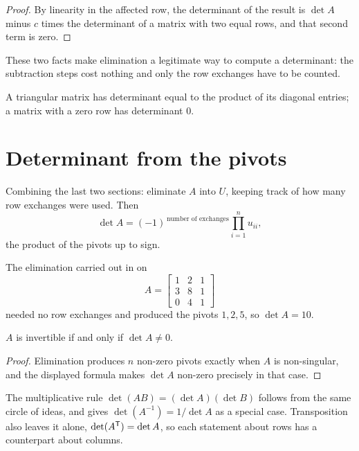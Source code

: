 \begin{proof}
By linearity in the affected row, the determinant of the result is
\(\det A\) minus \(c\) times the determinant of a matrix with two equal rows,
and that second term is zero.
\end{proof}

These two facts make elimination a legitimate way to compute a determinant: the
subtraction steps cost nothing and only the row exchanges have to be counted.

\begin{proposition}
A triangular matrix has determinant equal to the product of its diagonal
entries; a matrix with a zero row has determinant \(0\).
\end{proposition}

\section{Determinant from the pivots}

Combining the last two sections: eliminate \(A\) into \(U\), keeping track of how
many row exchanges were used. Then
\[
	\det A=(-1)^{\,\text{number of exchanges}}\prod_{i=1}^{n}u_{ii},
\]
the product of the pivots up to sign.

\begin{example}
The elimination carried out in  on
\[
	A=\begin{bmatrix}1&2&1\\3&8&1\\0&4&1\end{bmatrix}
\]
needed no row exchanges and produced the pivots \(1,2,5\), so \(\det A=10\).
\end{example}

\begin{theorem}
\(A\) is invertible if and only if \(\det A\neq0\).
\end{theorem}

\begin{proof}
Elimination produces \(n\) non-zero pivots exactly when \(A\) is non-singular,
and the displayed formula makes \(\det A\) non-zero precisely in that case.
\end{proof}

The multiplicative rule \(\det(AB)=(\det A)(\det B)\) follows from the same
circle of ideas, and gives \(\det(A^{-1})=1/\det A\) as a special case. Transposition also leaves it alone,
\(\det(A^{\mathsf{T}})=\det A\), so each statement about rows has a counterpart about
columns.

